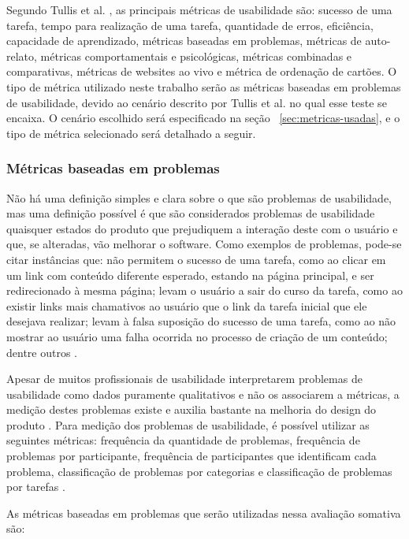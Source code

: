	Segundo Tullis et al. \cite{tullis:13}, as principais métricas de usabilidade são: sucesso de uma tarefa, tempo para realização de uma tarefa, quantidade de erros, eficiência, capacidade de aprendizado, métricas baseadas em problemas, métricas de auto-relato, métricas comportamentais e psicológicas, métricas combinadas e comparativas, métricas de websites ao vivo e métrica de ordenação de cartões. O tipo de métrica utilizado neste trabalho serão as métricas baseadas em problemas de usabilidade, devido ao cenário descrito por Tullis et al. no qual esse teste se encaixa. O cenário escolhido será especificado na seção ~\ref{sec:metricas-usadas}, e o tipo de métrica selecionado  será detalhado a seguir.
\\
\subsubsection{Métricas baseadas em problemas}
\label{sec:metricas-problemas}

    Não há uma definição simples e clara sobre o que são problemas de usabilidade, mas uma definição possível é que são considerados problemas de usabilidade quaisquer estados do produto que prejudiquem a interação deste com o usuário e que, se alteradas, vão melhorar o software. Como exemplos de problemas, pode-se citar instâncias que: não permitem o sucesso de uma tarefa, como ao clicar em um link com conteúdo diferente esperado, estando na página principal, e ser redirecionado à mesma página; levam o usuário a sair do curso da tarefa, como ao existir links mais chamativos ao usuário que o link da tarefa inicial que ele desejava realizar; levam à falsa suposição do sucesso de uma tarefa, como ao não mostrar ao usuário uma falha ocorrida no processo de criação de um conteúdo; dentre outros \cite{tullis:13}.

    Apesar de muitos profissionais de usabilidade interpretarem problemas de usabilidade como dados puramente qualitativos e não os associarem a métricas, a medição destes problemas existe e auxilia bastante na melhoria do design do produto \cite{tullis:13}. Para medição dos problemas de usabilidade, é possível utilizar as seguintes métricas: frequência da quantidade de problemas, frequência de problemas por participante, frequência de participantes que identificam cada problema, classificação de problemas por categorias e classificação de problemas por tarefas \cite{tullis:13}.

As métricas baseadas em problemas que serão utilizadas nessa avaliação somativa são:

